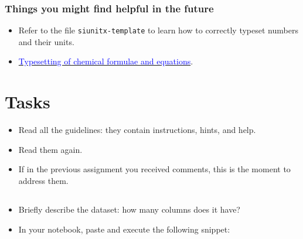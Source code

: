 \documentclass[
	german,
	accentcolor=9c,%
	type=intern,
	marginpar=false
	]{tudapub}
\begin{document}

\subsubsection{Things you might find helpful in the future}  %
\begin{itemize}
\item Refer to the file \texttt{siunitx-template} to learn how to correctly typeset numbers and their units.
\item \href{https://www.overleaf.com/learn/latex/Chemistry_formulae#Using_mhchem_to_typeset_chemical_formulae_and_equations}{\textcolor{blue}{Typesetting of chemical formulae and equations}}.
\end{itemize}

\clearpage

\section{Tasks}       %

\begin{itemize}
\item Read all the guidelines: they contain instructions, hints, and help. 
\item Read them again.
\item If in the previous assignment you received comments, this is the moment to address them.
\end{itemize}

\subsection{}
\begin{itemize}
\item Briefly describe the dataset: how many columns does it have?
\item In your notebook, paste and execute the following snippet:
\end{itemize}
\end{document}
